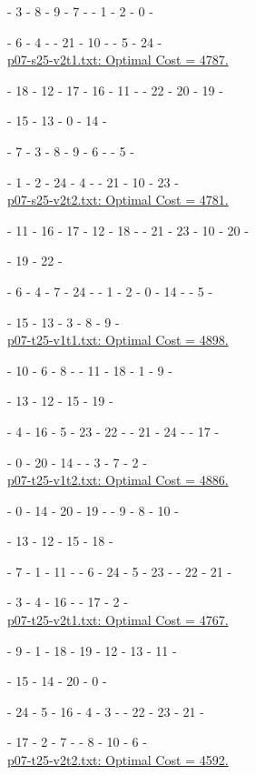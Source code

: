 \te - 3 - 8 - 9 - 7 - \te - 1 - 2 - 0 - \te

\te - 6 - 4 - \te - 21 - 10 - \te - 5 - 24 - \te
\\

\underline{p07-s25-v2t1.txt: Optimal Cost = 4787.}

\ta - 18 - 12 - 17 - 16 - 11 - \ta - 22 - 20 - 19 - \ta

\ta - 15 - 13 - 0 - 14 - \ta

\te - 7 - 3 - 8 - 9 - 6 - \te - 5 - \te

\te - 1 - 2 - 24 - 4 - \te - 21 - 10 - 23 - \te
\\

\underline{p07-s25-v2t2.txt: Optimal Cost = 4781.}

\ta - 11 - 16 - 17 - 12 - 18 - \ta - 21 - 23 - 10 - 20 - \ta

\ta - 19 - 22 - \ta

\te - 6 - 4 - 7 - 24 - \te - 1 - 2 - 0 - 14 - \te - 5 - \te

\te - 15 - 13 - 3 - 8 - 9 - \te
\\

\underline{p07-t25-v1t1.txt: Optimal Cost = 4898.}

\ta - 10 - 6 - 8 - \ta - 11 - 18 - 1 - 9 - \ta

\ta - 13 - 12 - 15 - 19 - \ta

\tb - 4 - 16 - 5 - 23 - 22 - \tb - 21 - 24 - \tb - 17 - \tb

\tb - 0 - 20 - 14 - \tb - 3 - 7 - 2 - \tb
\\

\underline{p07-t25-v1t2.txt: Optimal Cost = 4886.}

\ta - 0 - 14 - 20 - 19 - \ta - 9 - 8 - 10 - \ta

\ta - 13 - 12 - 15 - 18 - \ta

\tc - 7 - 1 - 11 - \tc - 6 - 24 - 5 - 23 - \tc - 22 - 21 - \tc

\tc - 3 - 4 - 16 - \tc - 17 - 2 - \tc
\\

\underline{p07-t25-v2t1.txt: Optimal Cost = 4767.}

\ta - 9 - 1 - 18 - 19 - 12 - 13 - 11 - \ta

\ta - 15 - 14 - 20 - 0 - \ta

\tc - 24 - 5 - 16 - 4 - 3 - \tc - 22 - 23 - 21 - \tc

\tc - 17 - 2 - 7 - \tc - 8 - 10 - 6 - \tc
\\

\underline{p07-t25-v2t2.txt: Optimal Cost = 4592.}


